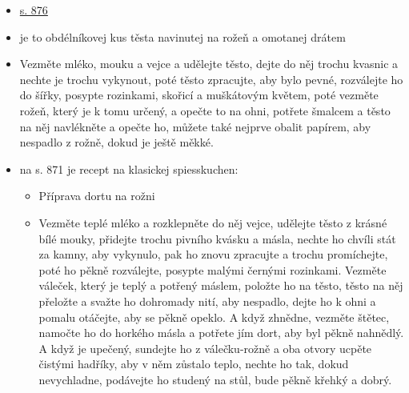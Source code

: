 \begin{itemize}
\begin{itemize}
    \begin{itemize}
    \tightlist
    \item
      \href{https://books.google.cz/books?id=PytAAAAAcAAJ&pg=PA1604&hl=cs&source=gbs_selected_pages&cad=1\#v=onepage&q=bohmisch&f=false}{s.
      876}
    \item
      je to obdélníkovej kus těsta navinutej na rožeň a omotanej drátem
    \item
      Vezměte mléko, mouku a vejce a udělejte těsto, dejte do něj trochu
      kvasnic a nechte je trochu vykynout, poté těsto zpracujte, aby
      bylo pevné, rozválejte ho do šířky, posypte rozinkami, skořicí a
      muškátovým květem, poté vezměte rožeň, který je k tomu určený, a
      opečte to na ohni, potřete šmalcem a těsto na něj navlékněte a
      opečte ho, můžete také nejprve obalit papírem, aby nespadlo z
      rožně, dokud je ještě měkké.
    \item
      na s. 871 je recept na klasickej spiesskuchen:

      \begin{itemize}
      \tightlist
      \item
        Příprava dortu na rožni
      \item
        Vezměte teplé mléko a rozklepněte do něj vejce, udělejte těsto z
        krásné bílé mouky, přidejte trochu pivního kvásku a másla,
        nechte ho chvíli stát za kamny, aby vykynulo, pak ho znovu
        zpracujte a trochu promíchejte, poté ho pěkně rozválejte,
        posypte malými černými rozinkami. Vezměte váleček, který je
        teplý a potřený máslem, položte ho na těsto, těsto na něj
        přeložte a svažte ho dohromady nití, aby nespadlo, dejte ho k
        ohni a pomalu otáčejte, aby se pěkně opeklo. A když zhnědne,
        vezměte štětec, namočte ho do horkého másla a potřete jím dort,
        aby byl pěkně nahnědlý. A když je upečený, sundejte ho z
        válečku-rožně a oba otvory ucpěte čistými hadříky, aby v něm
        zůstalo teplo, nechte ho tak, dokud nevychladne, podávejte ho
        studený na stůl, bude pěkně křehký a dobrý.
      \end{itemize}
    \end{itemize}
  \end{itemize}
\end{itemize}

